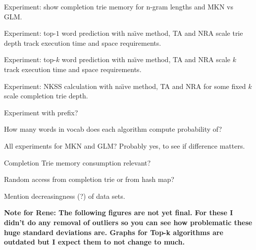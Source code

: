\begin{draft}
Experiment: show completion trie memory for n-gram lengths and MKN vs GLM.

Experiment: top-$1$ word prediction with na\"{\i}ve method, TA and NRA scale
trie depth track execution time and space requirements.

Experiment: top-$k$ word prediction with na\"{\i}ve method, TA and NRA scale
$k$ track execution time and space requirements.

Experiment: NKSS calculation with na\"{\i}ve method, TA and NRA for some fixed
$k$ scale completion trie depth.

Experiment with prefix?

How many words in vocab does each algorithm compute probability of?

All experiments for MKN and GLM?
Probably yes, to see if difference matters.

Completion Trie memory consumption relevant?

Random access from completion trie or from hash map?

Mention decreasingness (?) of data sets.
\end{draft}

\clearpage
\textbf{Note for Rene: The following figures are not yet final. For these
I didn't do any removal of outliers so you can see how problematic these huge
standard deviations are. Graphs for Top-k algorithms are outdated but I expect
them to not change to much.}

